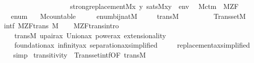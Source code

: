 \begin{isabellebody}
\ \ \ \ \ \ \ \ \ \ \ \ \ \ \ \ \ \ \ \ strong{\isacharunderscore}{\kern0pt}replacement{\isacharparenleft}{\kern0pt}{\isacharhash}{\kern0pt}{\isacharhash}{\kern0pt}M{\isacharcomma}{\kern0pt}{\isasymlambda}x\ y{\isachardot}{\kern0pt}\ sats{\isacharparenleft}{\kern0pt}M{\isacharcomma}{\kern0pt}{\isasymphi}{\isacharcomma}{\kern0pt}{\isacharbrackleft}{\kern0pt}x{\isacharcomma}{\kern0pt}y{\isacharbrackright}{\kern0pt}\ {\isacharat}{\kern0pt}\ env{\isacharparenright}{\kern0pt}{\isacharparenright}{\kern0pt}{\isachardoublequoteclose}\ \isanewline
\isanewline
{}\isamarkupfalse%
\ M{\isacharunderscore}{\kern0pt}ctm\ {\isacharequal}{\kern0pt}\ M{\isacharunderscore}{\kern0pt}ZF\ {\isacharplus}{\kern0pt}\isanewline
\ \ \ enum\isanewline
\ \ \ M{\isacharunderscore}{\kern0pt}countable{\isacharcolon}{\kern0pt}\ \ \ \ \ \ {\isachardoublequoteopen}enum{\isasymin}bij{\isacharparenleft}{\kern0pt}nat{\isacharcomma}{\kern0pt}M{\isacharparenright}{\kern0pt}{\isachardoublequoteclose}\isanewline
\ \ \ \ \ trans{\isacharunderscore}{\kern0pt}M{\isacharcolon}{\kern0pt}\ \ \ \ \ \ \ \ \ \ {\isachardoublequoteopen}Transset{\isacharparenleft}{\kern0pt}M{\isacharparenright}{\kern0pt}{\isachardoublequoteclose}\isanewline
\isanewline
{}\isanewline
{}\isamarkupfalse%
\ intf{\isacharcolon}{\kern0pt}\ M{\isacharunderscore}{\kern0pt}ZF{\isacharunderscore}{\kern0pt}trans\ {\isachardoublequoteopen}M{\isachardoublequoteclose}\isanewline
%
\isadelimproof
\ \ %
\endisadelimproof
%
\isatagproof
{}\isamarkupfalse%
\ M{\isacharunderscore}{\kern0pt}ZF{\isacharunderscore}{\kern0pt}trans{\isachardot}{\kern0pt}intro\isanewline
\ \ \ \ trans{\isacharunderscore}{\kern0pt}M\ upair{\isacharunderscore}{\kern0pt}ax\ Union{\isacharunderscore}{\kern0pt}ax\ power{\isacharunderscore}{\kern0pt}ax\ extensionality\isanewline
\ \ \ \ foundation{\isacharunderscore}{\kern0pt}ax\ infinity{\isacharunderscore}{\kern0pt}ax\ separation{\isacharunderscore}{\kern0pt}ax{\isacharbrackleft}{\kern0pt}simplified{\isacharbrackright}{\kern0pt}\ \isanewline
\ \ \ \ replacement{\isacharunderscore}{\kern0pt}ax{\isacharbrackleft}{\kern0pt}simplified{\isacharbrackright}{\kern0pt}\isanewline
\ \ \isamarkupfalse%
\ simp%
\endisatagproof
{\isafoldproof}%
%
\isadelimproof
\isanewline
%
\endisadelimproof
\isanewline
\isanewline
{}\isamarkupfalse%
\ transitivity\ {\isacharequal}{\kern0pt}\ Transset{\isacharunderscore}{\kern0pt}intf{\isacharbrackleft}{\kern0pt}OF\ trans{\isacharunderscore}{\kern0pt}M{\isacharbrackright}{\kern0pt}\isanewline

\end{isabellebody}

